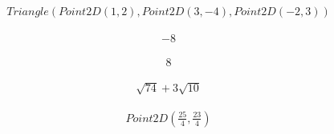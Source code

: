 \documentclass[letterpaper,10pt,english]{jupyterBook}
\begin{document}
\begin{sphinxVerbatim}[commandchars=\\\{\}]
   
\end{sphinxVerbatim}
\begin{equation*}
\begin{split}\displaystyle Triangle\left(Point2D\left(1, 2\right), Point2D\left(3, -4\right), Point2D\left(-2, 3\right)\right)\end{split}
\end{equation*}
\begin{sphinxVerbatim}[commandchars=\\\{\}]
 
\end{sphinxVerbatim}
\begin{equation*}
\begin{split}\displaystyle -8\end{split}
\end{equation*}
\begin{sphinxVerbatim}[commandchars=\\\{\}]
 
\end{sphinxVerbatim}
\begin{equation*}
\begin{split}\displaystyle 8\end{split}
\end{equation*}
\begin{sphinxVerbatim}[commandchars=\\\{\}]
 
\end{sphinxVerbatim}
\begin{equation*}
\begin{split}\displaystyle \sqrt{74} + 3 \sqrt{10}\end{split}
\end{equation*}
\begin{sphinxVerbatim}[commandchars=\\\{\}]
 
\end{sphinxVerbatim}
\begin{equation*}
\begin{split}\displaystyle Point2D\left(\frac{25}{4}, \frac{23}{4}\right)\end{split}
\end{equation*}
\end{document}
